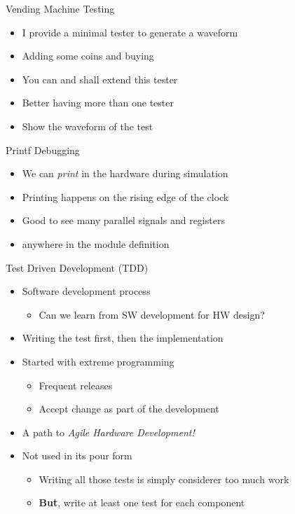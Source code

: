 \begin{frame}[fragile]{Vending Machine Testing}
\begin{itemize}
\item I provide a minimal tester to generate a waveform
\item Adding some coins and buying
\item You can and shall extend this tester
\item Better having more than one tester
\item Show the waveform of the test
\end{itemize}
\end{frame}


\begin{frame}[fragile]{Printf Debugging}
\begin{itemize}
\item We can \emph{print} in the hardware during simulation
\item Printing happens on the rising edge of the clock
\item Good to see many parallel signals and registers
\item {} anywhere in the module definition
\end{itemize}
\end{frame}



\begin{frame}[fragile]{Test Driven Development (TDD)}
\begin{itemize}
\item Software development process
\begin{itemize}
\item Can we learn from SW development for HW design?
\end{itemize}
\item Writing the test first, then the implementation
\item Started with extreme programming
\begin{itemize}
\item Frequent releases
\item Accept change as part of the development
\end{itemize}
\item A path to \emph{Agile Hardware Development!}
\item Not used in its pour form
\begin{itemize}
\item Writing all those tests is simply considerer too much work
\item \textbf{But}, write at least one test for each component
\end{itemize}
\end{itemize}
\end{frame}


